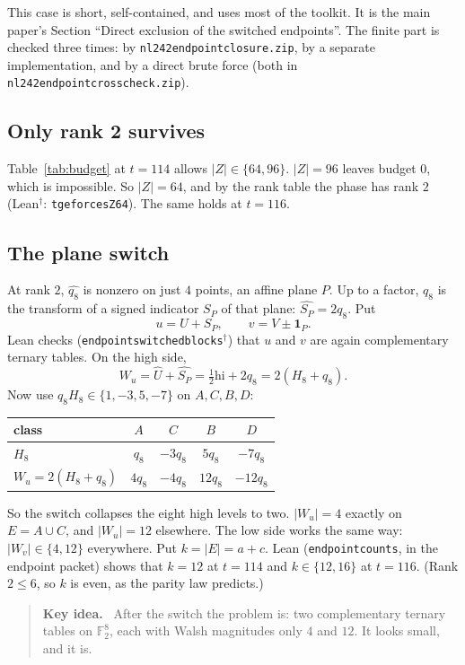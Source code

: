 \documentclass[11pt]{article}
\theoremstyle{definition}
\theoremstyle{remark}
\newcommand{\F}{\mathbb{F}}
\newcommand{\ind}{\mathbf{1}}
\newcommand{\hi}{\mathrm{hi}}
\newcommand{\code}[1]{\texttt{#1}}
\DeclareRobustCommand{\_}{\textunderscore\allowbreak}
\newenvironment{keyidea}{\begin{quote}\small\textbf{Key idea.}\ }{\end{quote}}
\begin{document}
This case is short, self-contained, and uses most of the toolkit. It is the main paper's Section ``Direct exclusion of the switched endpoints''. The finite part is checked three times: by \code{nl242\_endpoint\_closure.zip}, by a separate implementation, and by a direct brute force (both in \code{nl242\_endpoint\_crosscheck.zip}).

\subsection{Only rank 2 survives}
Table~\ref{tab:budget} at $t=114$ allows $|Z|\in\{64,96\}$. $|Z|=96$ leaves budget $0$, which is impossible. So $|Z|=64$, and by the rank table the phase has rank $2$ (Lean$^\dagger$: \code{t\_ge\_114\_forces\_Z64}). The same holds at $t=116$.

\subsection{The plane switch}
At rank $2$, $\widehat{q_8}$ is nonzero on just $4$ points, an affine plane $P$. Up to a factor, $q_8$ is the transform of a signed indicator $S_P$ of that plane: $\widehat{S_P}=2q_8$. Put
\[
  u=U+S_P,\qquad v=V\pm\ind_P .
\]
Lean checks (\code{endpoint\_switched\_blocks}$^\dagger$) that $u$ and $v$ are again complementary ternary tables. On the high side,
\[
  W_u=\widehat U+\widehat{S_P}=\tfrac12\hi+2q_8=2(H_8+q_8).
\]
Now use $q_8H_8\in\{1,-3,5,-7\}$ on $A,C,B,D$:
\begin{center}
\begin{tabular}{@{}lcccc@{}}
\toprule
class & $A$ & $C$ & $B$ & $D$\\
\midrule
$H_8$ & $q_8$ & $-3q_8$ & $5q_8$ & $-7q_8$\\
$W_u=2(H_8+q_8)$ & $4q_8$ & $-4q_8$ & $12q_8$ & $-12q_8$\\
\bottomrule
\end{tabular}
\end{center}
So the switch collapses the eight high levels to two. $|W_u|=4$ exactly on $E=A\cup C$, and $|W_u|=12$ elsewhere. The low side works the same way: $|W_v|\in\{4,12\}$ everywhere. Put $k=|E|=a+c$. Lean (\code{endpoint\_counts}, in the endpoint packet) shows that $k=12$ at $t=114$ and $k\in\{12,16\}$ at $t=116$. (Rank $2\le6$, so $k$ is even, as the parity law predicts.)

\begin{keyidea}
After the switch the problem is: two complementary ternary tables on $\F_2^8$, each with Walsh magnitudes only $4$ and $12$. It looks small, and it is.
\end{keyidea}
\end{document}

